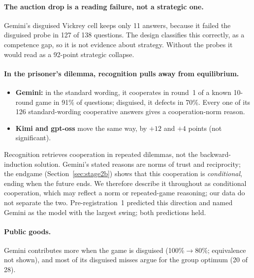 \documentclass[10pt]{article}
\theoremstyle{definition}
\theoremstyle{remark}
\begin{document}
\paragraph{The auction drop is a reading failure, not a strategic one.} Gemini's disguised
Vickrey cell keeps only 11 answers, because it failed the disguised probe in 127 of 138
questions. The design classifies this correctly, as a competence gap, so it is not evidence
about strategy. Without the probes it would read as a 92-point strategic collapse.

\paragraph{In the prisoner's dilemma, recognition pulls away from equilibrium.}
\begin{itemize}
\item \textbf{Gemini:} in the standard wording, it cooperates in round~1 of a known 10-round game in
  91\% of questions; disguised, it defects in 70\%. Every one of its 126 standard-wording
  cooperative answers gives a cooperation-norm reason.
\item \textbf{Kimi and gpt-oss} move the same way, by $+12$ and $+4$ points (not significant).
\end{itemize}
Recognition retrieves cooperation in repeated dilemmas, not the backward-induction solution.
Gemini's stated reasons are norms of trust and reciprocity; the endgame
(Section~\ref{sec:stage2b}) shows that this cooperation is \emph{conditional}, ending when the
future ends. We therefore describe it throughout as conditional cooperation, which may reflect a
norm or repeated-game reasoning; our data do not separate the two. Pre-registration~1 predicted this direction and named Gemini as the
model with the largest swing; both predictions held.

\paragraph{Public goods.} Gemini contributes more when the game is disguised (100\%$\to$80\%;
equivalence not shown), and most of its disguised misses argue for the group optimum (20 of 28).
\end{document}
